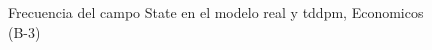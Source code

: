 \begin{figure}[H]
    \centering
    
    \caption{Frecuencia del campo State en el modelo real y tddpm, Economicos (B-3)}
    \label{frecuency-State-tddpm_mlp}
\end{figure}